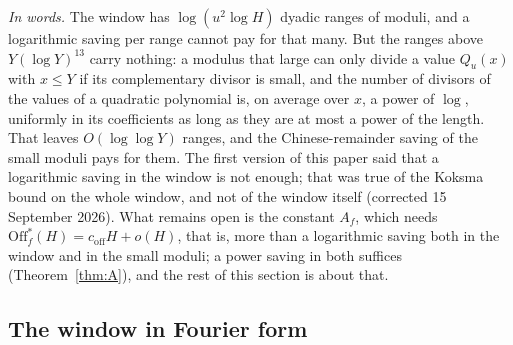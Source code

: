 \documentclass[11pt,a4paper]{article}
\theoremstyle{remark}\newtheorem{remark}[theorem]{Remark}
\newcommand{\Off}{\mathrm{Off}}\newcommand{\e}{\mathrm{e}}
\begin{document}
\emph{In words.} The window has $\log(u^2\log H)$ dyadic ranges of moduli, and a logarithmic saving per range cannot pay for
that many. But the ranges above $Y(\log Y)^{13}$ carry nothing: a modulus that large can only divide a value $Q_u(x)$ with
$x\le Y$ if its complementary divisor is small, and the number of divisors of the values of a quadratic polynomial is, on
average over $x$, a power of $\log$, uniformly in its coefficients as long as they are at most a power of the length. That leaves $O(\log\log Y)$ ranges, and the
Chinese-remainder saving of the small moduli pays for them. The first version of this paper said that a logarithmic
saving in the window is not enough; that was true of the Koksma bound on the whole window, and not of the window itself
(corrected 15 September 2026). What remains open is the constant $A_f$, which needs $\Off^\ast_f(H)=c_{\mathrm{off}}H+o(H)$, that is, more than a
logarithmic saving both in the window and in the small moduli; a power saving in both suffices (Theorem~\ref{thm:A}), and
the rest of this section is about that.

\subsection{The window in Fourier form}
\end{document}
